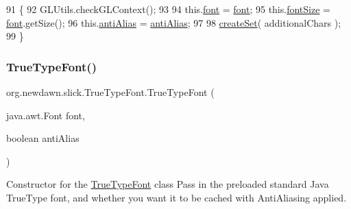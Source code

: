 \begin{DoxyCode}
91                                                                                        \{
92         GLUtils.checkGLContext();
93         
94         this.\mbox{\hyperlink{classorg_1_1newdawn_1_1slick_1_1_true_type_font_a7c0b002b6010aa855bf4391ecf749498}{font}} = \mbox{\hyperlink{classorg_1_1newdawn_1_1slick_1_1_true_type_font_a7c0b002b6010aa855bf4391ecf749498}{font}};
95         this.\mbox{\hyperlink{classorg_1_1newdawn_1_1slick_1_1_true_type_font_ac16e29cb90eac37712d06dc36aaced56}{fontSize}} = \mbox{\hyperlink{classorg_1_1newdawn_1_1slick_1_1_true_type_font_a7c0b002b6010aa855bf4391ecf749498}{font}}.getSize();
96         this.\mbox{\hyperlink{classorg_1_1newdawn_1_1slick_1_1_true_type_font_a1dc8e98ba06633544ec9f69c434dc126}{antiAlias}} = \mbox{\hyperlink{classorg_1_1newdawn_1_1slick_1_1_true_type_font_a1dc8e98ba06633544ec9f69c434dc126}{antiAlias}};
97 
98         \mbox{\hyperlink{classorg_1_1newdawn_1_1slick_1_1_true_type_font_ab68a888a4721942a09812e27bccddced}{createSet}}( additionalChars );
99     \}
\end{DoxyCode}
\mbox{\label{classorg_1_1newdawn_1_1slick_1_1_true_type_font_a8e2f2993f972ca7a18e47297f9ee12e4}} 
\subsubsection{\texorpdfstring{True\+Type\+Font()}{TrueTypeFont()}\hspace{0.1cm}{\footnotesize\ttfamily [2/2]}}
{\footnotesize\ttfamily org.\+newdawn.\+slick.\+True\+Type\+Font.\+True\+Type\+Font (\begin{DoxyParamCaption}\item[{java.\+awt.\+Font}]{font,  }\item[{boolean}]{anti\+Alias }\end{DoxyParamCaption})\hspace{0.3cm}{\ttfamily [inline]}}

Constructor for the \mbox{\hyperlink{classorg_1_1newdawn_1_1slick_1_1_true_type_font}{True\+Type\+Font}} class Pass in the preloaded standard Java True\+Type font, and whether you want it to be cached with Anti\+Aliasing applied.


